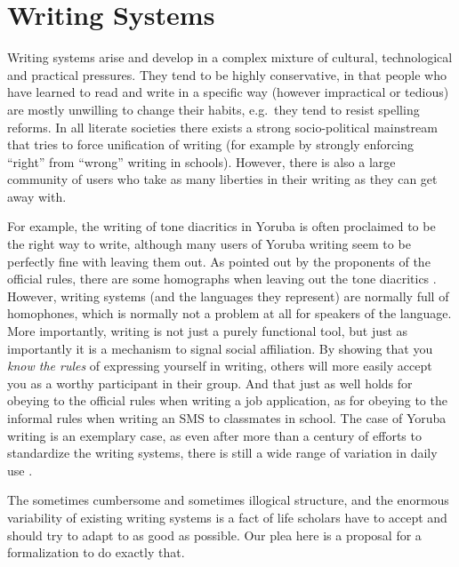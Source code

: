 \chapter{Writing Systems} \label{writing_systems}


Writing systems arise and develop in a complex mixture of cultural,
technological and practical pressures. They tend to be highly conservative, in
that people who have learned to read and write in a specific way (however
impractical or tedious) are mostly unwilling to change their habits, e.g.~they
tend to resist spelling reforms. In all literate societies there exists a strong
socio-political mainstream that tries to force unification of writing (for
example by strongly enforcing ``right'' from ``wrong'' writing in schools).
However, there is also a large community of users who take as many liberties in
their writing as they can get away with.

For example, the writing of tone diacritics in Yoruba is often proclaimed to be
the right way to write, although many users of Yoruba writing seem to be
perfectly fine with leaving them out. As pointed out by the proponents of the
official rules, there are some homographs when leaving out the tone diacritics
\citet[44]{Olumuyiw2013}. However, writing systems (and the languages they
represent) are normally full of homophones, which is normally not a problem at
all for speakers of the language. More importantly, writing is not just a purely
functional tool, but just as importantly it is a mechanism to signal social
affiliation. By showing that you \textit{know the rules} of expressing yourself
in writing, others will more easily accept you as a worthy participant in their
group. And that just as well holds for obeying to the official rules when
writing a job application, as for obeying to the informal rules when writing an
SMS to classmates in school. The case of Yoruba writing is an exemplary case, as
even after more than a century of efforts to standardize the writing systems,
there is still a wide range of variation in daily use \citet{Olumuyiw2013}.

The sometimes cumbersome and sometimes illogical structure, and the enormous
variability of existing writing systems is a fact of life scholars have to
accept and should try to adapt to as good as possible. Our plea here is a
proposal for a formalization to do exactly that.

